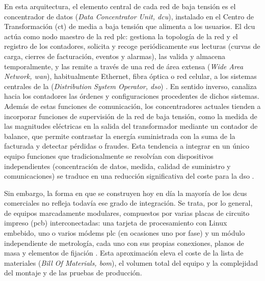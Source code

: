 En esta arquitectura, el elemento central de cada red de baja tensión es el concentrador de datos (\textit{Data Concentrator Unit, \gls{dcu}}), instalado en el Centro de Transformación (\gls{ct}) de media a baja tensión que alimenta a los usuarios. El \gls{dcu} actúa como nodo maestro de la red \gls{plc}: gestiona la topología de la red y el registro de los contadores, solicita y recoge periódicamente sus lecturas (curvas de carga, cierres de facturación, eventos y alarmas), las valida y almacena temporalmente, y las remite a través de una red de área extensa (\textit{Wide Area Network, \gls{wan}}), habitualmente Ethernet, fibra óptica o red celular, a los sistemas centrales de la  (\textit{Distribution System Operator, \gls{dso}}) \cite{5764443, SHARMA2017704}. En sentido inverso, canaliza hacia los contadores las órdenes y configuraciones procedentes de dichos sistemas. Además de estas funciones de comunicación, los concentradores actuales tienden a incorporar funciones de supervisión de la red de baja tensión, como la medida de las magnitudes eléctricas en la salida del transformador mediante un contador de balance, que permite contrastar la energía suministrada con la suma de la facturada y detectar pérdidas o fraudes. Esta tendencia a integrar en un único equipo funciones que tradicionalmente se resolvían con dispositivos independientes (concentración de datos, medida, calidad de suministro y comunicaciones) se traduce en una reducción significativa del coste para la \gls{dso} \cite{SHARMA2017704}.

Sin embargo, la forma en que se construyen hoy en día la mayoría de los \glspl{dcu} comerciales no refleja todavía ese grado de integración. Se trata, por lo general, de equipos marcadamente modulares, compuestos por varias placas de circuito impreso (\gls{pcb}) interconectadas: una tarjeta de procesamiento con Linux embebido, uno o varios módems \gls{plc} (en ocasiones uno por fase) y un módulo independiente de metrología, cada uno con sus propias conexiones, planos de masa y elementos de fijación \cite{6925952, 10488780}. Esta aproximación eleva el coste de la lista de materiales (\textit{Bill Of Materials, \gls{bom}}), el volumen total del equipo y la complejidad del montaje y de las pruebas de producción.

